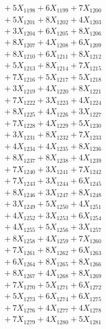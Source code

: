 \documentclass[a4paper,10pt]{article}
\begin{document}
{\begin{align}
&\;  + 5 X_{1198} + 6 X_{1199} + 7 X_{1200} \\[0.3ex]
&\;  + 5 X_{1201} + 8 X_{1202} + 4 X_{1203} \\[0.3ex]
&\;  + 3 X_{1204} + 6 X_{1205} + 8 X_{1206} \\[0.3ex]
&\;  + 8 X_{1207} + 4 X_{1208} + 6 X_{1209} \\[0.5ex]\allowbreak
&\;  + 8 X_{1210} + 6 X_{1211} + 8 X_{1212} \\[0.3ex]
&\;  + 5 X_{1213} + 8 X_{1214} + 7 X_{1215} \\[0.3ex]
&\;  + 7 X_{1216} + 5 X_{1217} + 5 X_{1218} \\[0.3ex]
&\;  + 3 X_{1219} + 4 X_{1220} + 8 X_{1221} \\[0.3ex]
&\;  + 7 X_{1222} + 3 X_{1223} + 4 X_{1224} \\[0.3ex]
&\;  + 8 X_{1225} + 4 X_{1226} + 3 X_{1227} \\[0.3ex]
&\;  + 7 X_{1228} + 4 X_{1229} + 5 X_{1230} \\[0.3ex]
&\;  + 3 X_{1231} + 8 X_{1232} + 7 X_{1233} \\[0.3ex]
&\;  + 4 X_{1234} + 4 X_{1235} + 8 X_{1236} \\[0.3ex]
&\;  + 8 X_{1237} + 8 X_{1238} + 4 X_{1239} \\[0.5ex]\allowbreak
&\;  + 7 X_{1240} + 3 X_{1241} + 7 X_{1242} \\[0.3ex]
&\;  + 7 X_{1243} + 3 X_{1244} + 6 X_{1245} \\[0.3ex]
&\;  + 8 X_{1246} + 3 X_{1247} + 8 X_{1248} \\[0.3ex]
&\;  + 3 X_{1249} + 5 X_{1250} + 4 X_{1251} \\[0.3ex]
&\;  + 4 X_{1252} + 3 X_{1253} + 6 X_{1254} \\[0.3ex]
&\;  + 4 X_{1255} + 5 X_{1256} + 3 X_{1257} \\[0.3ex]
&\;  + 8 X_{1258} + 4 X_{1259} + 7 X_{1260} \\[0.3ex]
&\;  + 7 X_{1261} + 8 X_{1262} + 6 X_{1263} \\[0.3ex]
&\;  + 6 X_{1264} + 8 X_{1265} + 8 X_{1266} \\[0.3ex]
&\;  + 8 X_{1267} + 4 X_{1268} + 8 X_{1269} \\[0.5ex]\allowbreak
&\;  + 7 X_{1270} + 5 X_{1271} + 6 X_{1272} \\[0.3ex]
&\;  + 5 X_{1273} + 6 X_{1274} + 6 X_{1275} \\[0.3ex]
&\;  + 7 X_{1276} + 4 X_{1277} + 4 X_{1278} \\[0.3ex]
&\;  + 7 X_{1279} + 4 X_{1280} + 5 X_{1281} \\[0.3ex]

\end{align}}
\end{document}
